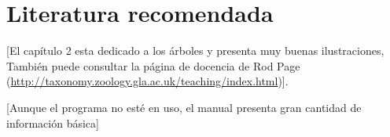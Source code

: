 
\section*{Literatura recomendada}

\cite{PageHolmes1998} [El cap\'itulo 2 esta dedicado a los \'arboles y presenta muy buenas ilustraciones, Tambi\'en puede consultar la p\'agina de docencia de Rod Page (\url{http://taxonomy.zoology.gla.ac.uk/teaching/index.html})].

\cite{McClade4} [Aunque el programa no est\'e en uso, el manual presenta gran cantidad de informaci\'on b\'asica]

